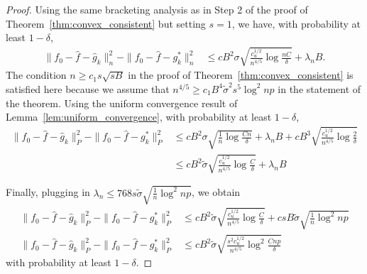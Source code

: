 \begin{proof}
Using the same bracketing analysis as in Step 2 of the proof of Theorem~\ref{thm:convex_consistent} but setting $s=1$, we have, with probability at least $1-\delta$,
\begin{align*}
\| f_0 - \hat{f} - \hat{g}_k \|_n^2 - \|f_0 - \hat{f} - g^*_k \|_n^2 &\leq
  c B^2 \sigma \sqrt{ \frac{c_u^{1/2}}{n^{4/5}} \log \frac{nC}{\delta} }+ \lambda_n B.
\end{align*}
The condition $n \geq c_1 s\sqrt{sB}$ in the proof of Theorem~\ref{thm:convex_consistent} is satisfied here because we assume that $n^{4/5} \geq c_1 B^4 \tilde{\sigma}^2 s^5 \log^2 np$ in the statement of the theorem.
Using the uniform convergence result of Lemma~\ref{lem:uniform_convergence}, with probability at least $1-\delta$,
\begin{align*}
\| f_0 - \hat{f} - \hat{g}_k \|_P^2 - \|f_0 - \hat{f} - g^*_k \|_P^2 &\leq
  c B^2 \sigma \sqrt{ \frac{1}{n} \log \frac{Cn}{\delta} }+ \lambda_n B +
  c B^3 \sqrt{\frac{c_u^{1/2}}{n^{4/5}} \log \frac{2}{\delta} } \\
 &\leq c B^2 \tilde{\sigma} \sqrt{\frac{c_u^{1/2}}{n^{4/5}} \log \frac{C}{\delta}}+ \lambda_n B
\end{align*}

Finally, plugging in $\lambda_n \leq 768 s \tilde{\sigma} \sqrt{
  \frac{1}{n} \log^2 np}$, we obtain
\begin{align*}
\| f_0 - \hat{f} - \hat{g}_k \|_P^2 - \|f_0 - \hat{f} - g^*_k \|_P^2 &
\leq c B^2 \tilde{\sigma} \sqrt{\frac{c_u^{1/2}}{n^{4/5}} \log \frac{C}{\delta}}+ 
    c s B \tilde{\sigma} \sqrt{\frac{1}{n} \log^2 np}\\
\| f_0 - \hat{f} - \hat{g}_k \|_P^2 - \|f_0 - \hat{f} - g^*_k \|_P^2 &
\leq c B^2 \tilde{\sigma} \sqrt{\frac{s^2 c_u^{1/2}}{n^{4/5}} \log^2 \frac{Cnp}{\delta}}
\end{align*}
with probability at least $1-\delta$.


\end{proof}
